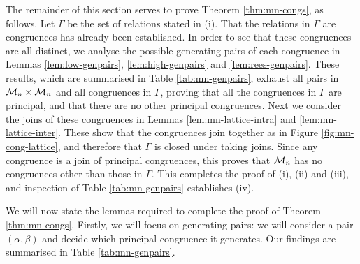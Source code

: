 The remainder of this section serves to prove Theorem \ref{thm:mn-congs}, as
follows.  Let $\Gamma$ be the set of relations stated in (i).  That the
relations in $\Gamma$ are congruences has already been established.  In order to
see that these congruences are all distinct, we analyse the possible generating
pairs of each congruence in Lemmas \ref{lem:low-genpairs},
\ref{lem:high-genpairs} and \ref{lem:rees-genpairs}.  These results, which are
summarised in Table \ref{tab:mn-genpairs}, exhaust all pairs in
$\mathcal{M}_n \times \mathcal{M}_n$ and all congruences in $\Gamma$, proving that all the
congruences in $\Gamma$ are principal, and that there are no other principal
congruences.  Next we consider the joins of these congruences in Lemmas
\ref{lem:mn-lattice-intra} and \ref{lem:mn-lattice-inter}.  These show that the
congruences join together as in Figure \ref{fig:mn-cong-lattice}, and therefore
that $\Gamma$ is closed under taking joins.  Since any congruence is a join of
principal congruences, this proves that $\mathcal{M}_n$ has no congruences other than
those in $\Gamma$.  This completes the proof of (i), (ii) and (iii), and
inspection of Table \ref{tab:mn-genpairs} establishes (iv).

We will now state the lemmas required to complete the
proof of Theorem \ref{thm:mn-congs}.  Firstly, we will focus on generating
pairs: we will consider a pair $(\alpha, \beta)$ and decide which principal
congruence it generates.  Our findings are summarised in Table
\ref{tab:mn-genpairs}.


